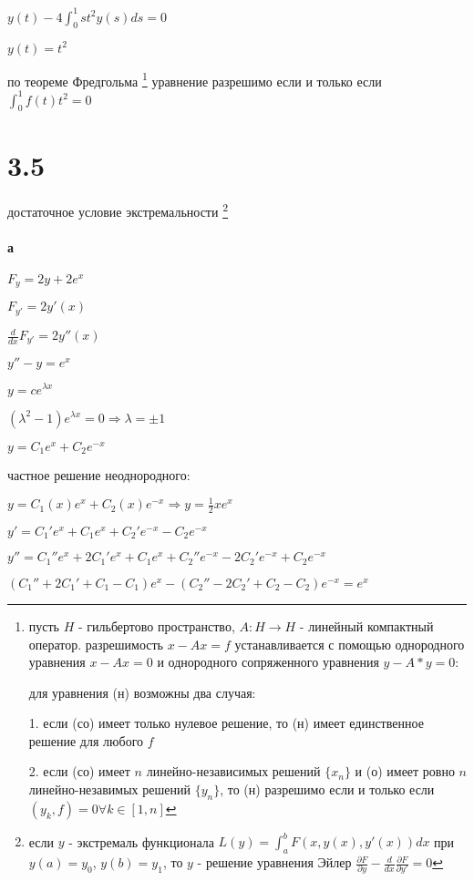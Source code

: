 \documentclass[russian]{article}
\begin{document}
$y(t) - 4 \int_0^1 s t^2 y(s) ds = 0$

$y(t) = t^2$

по теореме Фредгольма \footnote{
	пусть $H$ - гильбертово пространство, $A:H \to H$ - линейный компактный оператор. разрешимость $x-Ax=f$ устанавливается с помощью однородного уравнения $x-Ax=0$ и однородного сопряженного уравнения $y-A*y=0$:
	
	для уравнения (н) возможны два случая:
	
	1. если (со) имеет только нулевое решение, то (н) имеет единственное решение для любого $f$
	
	2. если (со) имеет $n$ линейно-независимых решений $\{x_n\}$ и (о) имеет ровно $n$ линейно-незавимых решений $\{y_n\}$, то (н) разрешимо если и только если $(y_k,f) = 0 \forall k\in[1,n]$
}
уравнение разрешимо если и только если $\int_0^1f(t)t^2 = 0$

\section*{3.5}

достаточное условие экстремальности \footnote{
	если $y$ - экстремаль функционала $L(y)=\int_a^b F(x,y(x),y'(x))dx$ при $y(a)=y_0$, $y(b)=y_1$, то $y$ - решение уравнения Эйлер $\frac{\partial F}{\partial y} - \frac{d}{dx}\frac{\partial F}{\partial y'} = 0$
}

\paragraph*{а}

$F_y = 2y+2e^x$

$F_{y'} = 2y'(x)$

$\frac{d}{dx}F_{y'} = 2y''(x)$

$y'' - y = e^x$

$y=c e^{\lambda x}$

$(\lambda^2-1)e^{\lambda x} = 0 \Rightarrow \lambda = \pm 1$

$y=C_1 e^x + C_2 e^{-x}$

частное решение неоднородного:

$y=C_1(x) e^x + C_2(x) e^{-x} \Rightarrow y= \frac{1}{2}x e^x $

$y' = C_1' e^x +C_1 e^x + C_2' e^{-x} - C_2 e^{-x}$

$y'' = C_1'' e^x + 2 C_1' e^x + C_1 e^x + C_2'' e^{-x} - 2 C_2 ' e^{-x} + C_2 e^{-x}$

$(C_1'' + 2C_1' + C_1 - C_1) e^x - (C_2''-2C_2' + C_2 - C_2) e^{-x} = e^x$
\end{document}
